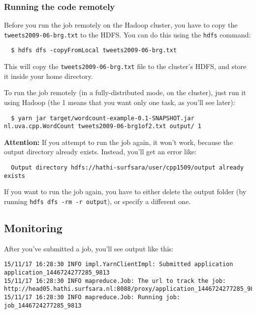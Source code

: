 \documentclass[a4paper,11pt]{article}
\begin{document}
\subsubsection{Running the code remotely}

Before you run the job remotely on the Hadoop cluster, you have to copy the \texttt{tweets2009-06-brg.txt} to the HDFS. You can do this
using the \texttt{hdfs} command:

\begin{lstlisting}
  $ hdfs dfs -copyFromLocal tweets2009-06-brg.txt
\end{lstlisting}

This will copy the \texttt{tweets2009-06-brg.txt} file to the cluster's HDFS, and store it inside your home directory.

To run the job remotely (in a fully-distributed mode, on the cluster), just run it using Hadoop (the 1 means that you want
only one task, as you'll see later):
\begin{lstlisting}
  $ yarn jar target/wordcount-example-0.1-SNAPSHOT.jar nl.uva.cpp.WordCount tweets2009-06-brg1of2.txt output/ 1
\end{lstlisting}

\textbf{Attention:} If you attempt to run the job again, it won't work, because the output directory already exists. Instead, you'll get an error like:
\begin{lstlisting}
  Output directory hdfs://hathi-surfsara/user/cpp1509/output already exists
\end{lstlisting}

If you want to run the job again, you have to either delete the output folder (by running \texttt{hdfs dfs -rm -r output}), or specify a different one. 

\subsection{Monitoring}

After you've submitted a job, you'll see output like this:

\begin{lstlisting}
15/11/17 16:28:30 INFO impl.YarnClientImpl: Submitted application application_1446724277285_9813
15/11/17 16:28:30 INFO mapreduce.Job: The url to track the job: http://head05.hathi.surfsara.nl:8088/proxy/application_1446724277285_9813/
15/11/17 16:28:30 INFO mapreduce.Job: Running job: job_1446724277285_9813
\end{lstlisting}
\end{document}
